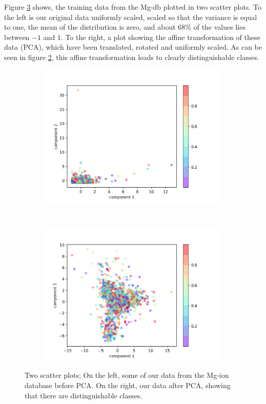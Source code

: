 	Figure \ref{fig:PCA} shows, the training data from the Mg-db plotted in two scatter plots. To the left is our original data uniformly scaled, scaled so that the variance is equal to one, the mean of the distribution is zero, and about $68\%$ of the values lies between $-1$ and $1$. To the right, a plot showing the affine transformation of these data (PCA), which have been translated, rotated and uniformly scaled. As can be seen in figure \ref{fig:PCA_b}, this affine transformation leads to clearly distinguishable classes.

\begin{figure}[h]
    \centering
    \begin{subfigure}{0.48\textwidth}
        \centering
        \includegraphics[width=\linewidth]{theory/figures/standardscalar_bpca.png}
        \caption{}
        \label{fig:PCA_a}
    \end{subfigure}%
    ~
        \begin{subfigure}{0.48\textwidth}
        \centering
        \includegraphics[width=\linewidth]{theory/figures/standardscalar_apca.png}
        \caption{}
        \label{fig:PCA_b}
    \end{subfigure}
	\caption{Two scatter plots; On the left, some of our data from the Mg-ion database before PCA. On the right, our data after PCA, showing that there are distinguishable classes.}
	\label{fig:PCA}
\end{figure}
